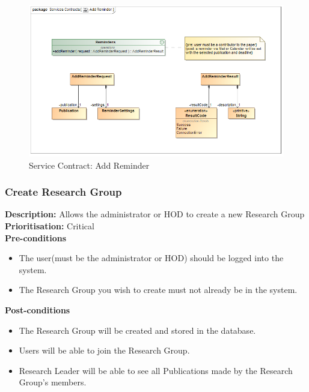 \documentclass[a4paper]{article}
\begin{document}
                	\begin{figure}[H]
                		\centering
                		\includegraphics[width=\textwidth]{../Assignment1/5.1.10.Add.Reminder.Services.Contract.png}
                		\caption{Service Contract: Add Reminder}
                	\end{figure}
            
            \pagebreak
    \subsubsection{Create Research Group}
    	\textbf{Description:} Allows the administrator or HOD to create a new Research Group\\
    	\textbf{Prioritisation:} Critical\\
    	
    	\textbf{Pre-conditions}
    	 \begin{itemize}
    		\item The user(must be the administrator or HOD) should be logged into the system.
    		\item The Research Group you wish to create must not already be in the system.
    	\end{itemize}
    	
    	\textbf{Post-conditions}
    	 \begin{itemize}
    		\item The Research Group will be created and stored in the database.
    		\item Users will be able to join the Research Group.
    		\item Research Leader will be able to see all Publications made by the Research Group's members.
    	\end{itemize}
    	
\end{document}

